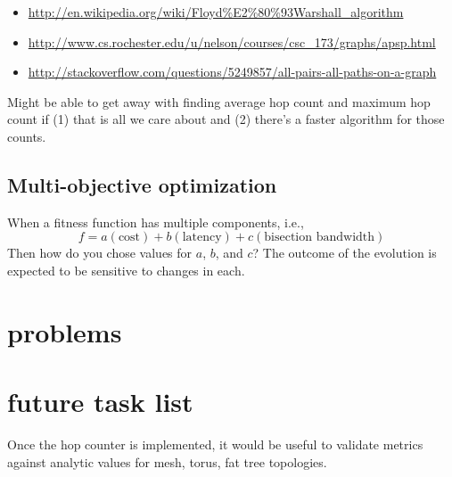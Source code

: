 \documentclass[pdftex]{article}
\begin{document}
\begin{itemize}
 \item \href{http://en.wikipedia.org/wiki/Floyd\%E2\%80\%93Warshall_algorithm}{http://en.wikipedia.org/wiki/Floyd\%E2\%80\%93Warshall\_algorithm}
 \item \href{http://www.cs.rochester.edu/u/nelson/courses/csc_173/graphs/apsp.html}{http://www.cs.rochester.edu/u/nelson/courses/csc\_173/graphs/apsp.html}
 \item \href{http://stackoverflow.com/questions/5249857/all-pairs-all-paths-on-a-graph}{http://stackoverflow.com/questions/5249857/all-pairs-all-paths-on-a-graph}
\end{itemize}
Might be able to get away with finding average hop count and maximum hop count if (1) that is all we care about and (2) there's a faster algorithm for those counts.


\subsection{Multi-objective optimization}
 
When a fitness function has multiple components, i.e.,
\begin{equation}
 f=a(\textrm{cost})+b(\textrm{latency})+c(\textrm{bisection\ bandwidth})
\end{equation}
Then how do you chose values for $a$, $b$, and $c$? The outcome of the evolution is expected to be sensitive to changes in each.
 
\section{problems}
 
\section{future task list}

Once the hop counter is implemented, it would be useful to validate metrics against analytic values for mesh, torus, fat tree topologies.
\end{document}

